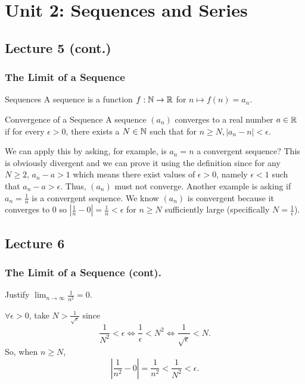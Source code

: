 \section{Unit 2: Sequences and Series}
\subsection{Lecture 5 (cont.)}
\subsubsection{The Limit of a Sequence}
\begin{defbox}{Sequences}
    A sequence is a function $f: \mathbb N \to \mathbb R$ for $n \mapsto f(n) = a_n$. 
\end{defbox}

\begin{defbox}{Convergence of a Sequence}
    A sequence $(a_n)$ converges to a real number $a \in \mathbb R$ if for every $\epsilon > 0$, there exists a $N \in \mathbb N$ such that for $n \geq N, |a_n - n| < \epsilon$.
\end{defbox}

We can apply this by asking, for example, is $a_n = n$ a convergent sequence? This is obviously divergent and we can prove it using the definition since for any $N \geq 2$, $a_n - a > 1$ which means there exist values of $\epsilon > 0$, namely $\epsilon < 1$ such that $a_n - a > \epsilon$. Thus, $(a_n)$ must not converge. Another example is asking if $a_n = \frac{1}{n}$ is a convergent sequence. We know $(a_n)$ is convergent because it converges to $0$ so $|\frac{1}{n} - 0| = \frac{1}{n} < \epsilon$ for $n \geq N$ sufficiently large (specifically $N = \frac{1}{\epsilon}$).

\subsection{Lecture 6}
\subsubsection{The Limit of a Sequence (cont).}
\begin{example}{}{}
    Justify $\lim_{n\to\infty} \frac{1}{n^2} = 0$.
    \begin{solution}
        $\forall \epsilon > 0$, take $N > \frac{1}{\sqrt{\epsilon}}$ since 
        \[
            \frac{1}{N^2} < \epsilon \Leftrightarrow \frac{1}{\epsilon} < N^2 \Leftrightarrow \frac{1}{\sqrt{\epsilon}} < N.
        \]
        So, when $n \geq N$, 
        \[
            \left|\frac{1}{n^2} - 0\right| = \frac{1}{n^2} < \frac{1}{N^2} < \epsilon. 
        \]
    \end{solution}
\end{example}

